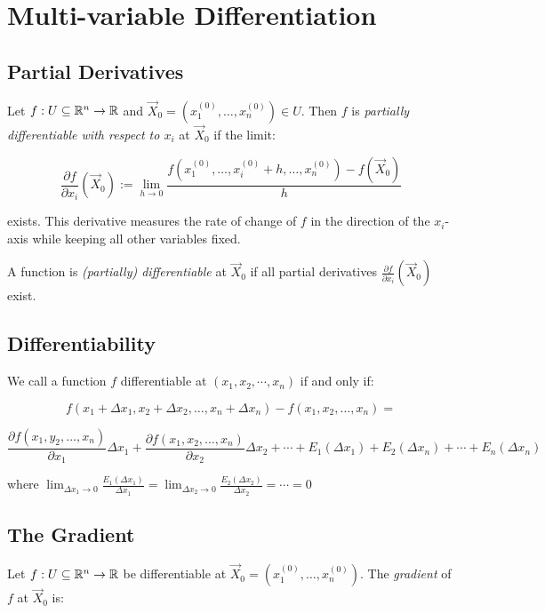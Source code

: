 \newpage
\section{Multi-variable Differentiation}

\subsection{Partial Derivatives}

Let \( f : U \subseteq \mathbb{R}^n \to \mathbb{R} \) and \( \vec{X}_0 = (x_1^{(0)}, \dots, x_n^{(0)}) 
\in U \). Then \(f\) is \emph{partially differentiable with respect to \( x_i \)} at 
\( \vec{X}_0 \) if the limit:

\[
    \frac{\partial f}{\partial x_i}(\vec{X}_0) := \lim_{h \to 0} \frac{f(x_1^{(0)}, \dots, x_i^{(0)} + h,
     \dots, x_n^{(0)}) - f(\vec{X}_0)}{h}
\]

exists. This derivative measures the rate of change of \(f\) in the direction of the \( x_i \)-axis 
while keeping all other variables fixed.

A function is \emph{(partially) differentiable} at \( \vec{X}_0 \) if all partial derivatives 
\( \frac{\partial f}{\partial x_i}(\vec{X}_0) \) exist.

\subsection{Differentiability}

We call a function \(f\) differentiable at \((x_1, x_2, \cdots, x_n)\) if and only if:

\[
    f(x_1 + \Delta x_1, x_2 + \Delta x_2, \dots, x_n + \Delta x_n) - f(x_1, x_2, \dots, x_n) = 
\]

\[
    \frac{\partial f(x_1, y_2, \dots, x_n)}{\partial x_1} \Delta x_1 + \frac{\partial f(x_1, x_2, 
    \dots, x_n)}{\partial x_2} \Delta x_2 + \cdots + E_1(\Delta x_1) + E_2(\Delta x_n) + \cdots + 
    E_n(\Delta x_n)
\]

where \(\lim_{\Delta x_1 \to 0}\frac{E_1(\Delta x_1)}{\Delta x_1} = \lim_{\Delta x_2 \to 0}
\frac{E_2(\Delta x_2)}{\Delta x_2} = \cdots = 0\)

\subsection{The Gradient}

Let \( f : U \subseteq \mathbb{R}^n \to \mathbb{R} \) be differentiable at \( \vec{X}_0 = (x_1^{(0)}, 
\dots, x_n^{(0)}) \). The \emph{gradient} of \(f\) at \( \vec{X}_0 \) is:

